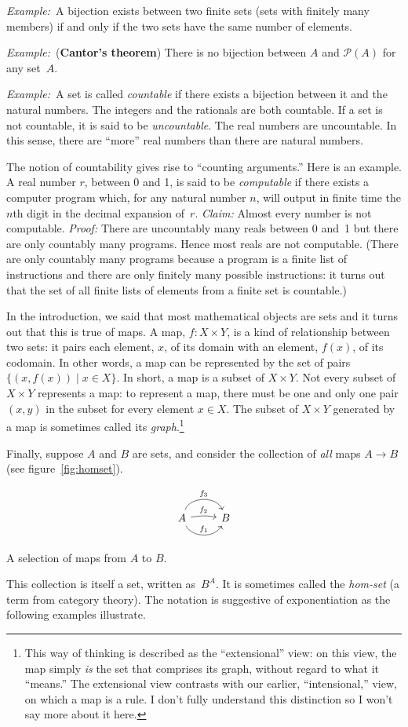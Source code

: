 \documentclass[12pt, a4paper]{article}
\newcommand{\defn}[1]{\textbf{#1}}
\newcommand{\eg}{\emph{Example:}\relax}
\begin{document}
\eg\ A bijection exists between two finite sets (sets with finitely
many members) if and only if the two sets have the same number of
elements.

\eg\ (\defn{Cantor's theorem}) There is no bijection between $A$ and
$\mathcal{P}(A)$ for any set~$A$.

\eg\ A set is called \emph{countable} if there exists a bijection
between it and the natural numbers. The integers and the rationals are
both countable. If a set is not countable, it is said to be
\emph{uncountable}. The real numbers are uncountable. In this sense,
there are ``more'' real numbers than there are natural numbers.

The notion of countability gives rise to “counting arguments.” Here is
an example. A real number $r$, between 0 and 1, is said to be
\emph{computable} if there exists a computer program which, for any
natural number $n$, will output in finite time the $n$th digit in the
decimal expansion of~$r$. \emph{Claim:} Almost every number is not
computable. \emph{Proof:} There are uncountably many reals between 0
and~1 but there are only countably many programs. Hence most reals are
not computable. (There are only countably many programs because a
program is a finite list of instructions and there are only finitely
many possible instructions: it turns out that the set of all finite
lists of elements from a finite set is countable.)

In the introduction, we said that most mathematical objects are sets
and it turns out that this is true of maps. A map, $f:X\times Y$, is a kind
of relationship between two sets: it pairs each element, $x$, of its
domain with an element, $f(x)$, of its codomain. In other words, a map
can be represented by the set of pairs $\{(x,f(x)) \mid x\in X\}$. In
short, a map is a subset of $X\times Y$. Not every subset of $X\times Y$
represents a map: to represent a map, there must be one and only one
pair $(x,y)$ in the subset for every element $x\in X$. The subset of $X\times
Y$ generated by a map is sometimes called its
\emph{graph}.\footnote{This way of thinking is described as the
“extensional” view: on this view, the map simply \emph{is} the set
that comprises its graph, without regard to what it “means.” The
extensional view contrasts with our earlier, “intensional,” view, on
which a map is a rule. I don't fully understand this distinction so I
won't say more about it here.}

Finally, suppose $A$ and $B$ are sets, and consider the collection of
\emph{all} maps $A\to B$ (see figure~\ref{fig:homset}).
\begin{sidefigure}
  \[\begin{tikzcd}
  A
  \arrow[r, out=-60, in=-120, "f_1"]
  \arrow[r, out=10, in=170, "f_2"]
  \arrow[r, out=70, in=110, "f_3"] & B 
  \end{tikzcd}\]
  \caption{A selection of maps from $A$ to $B$.\label{fig:homset}}
\end{sidefigure}
This collection is itself a set, written as~$B^A$. It is sometimes
called the \emph{hom-set} (a term from category theory). The notation
is suggestive of exponentiation as the following examples illustrate.
\end{document}

